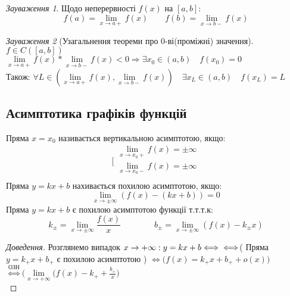 \documentclass[14pt,a4paper]{scrartcl}
\theoremstyle{definition}
\theoremstyle{remark}
\newtheorem*{remark}{Зауваження}
\theoremstyle{definition}
\theoremstyle{definition}
\begin{document}
  \begin{remark}
    Щодо неперервності  $f(x)$ на $[a,b]$:
    $$f(a) =  \lim\limits_{x\to a+}{f(x)} \qquad   f(b) = \lim\limits_{x\to b-}{f(x)}$$
  \end{remark}
\begin{remark}[Узагальнення теореми про 0-ві(проміжні) значення]
$f \in C([a,b]) \quad$\\
 $\lim\limits_{x\to a+}{f(x)} *  \lim\limits_{x\to b-}{f(x)} < 0 \Rightarrow \exists x_0 \in (a, b) \quad f(x_0) = 0$\\
 Також: $\forall L \in (\lim\limits_{x\to a+}{f(x)}, \lim\limits_{x\to b-}{f(x)} ) \quad \exists x_L \in (a,b) \quad f(x_L) = L$
\end{remark}


\subsection{Асимптотика графіків функцій}
Пряма $x = x_0$ називається вертикальною асимптотою, якщо:\\
$$\Bigg[ \begin{gathered}
  \lim\limits_{x\to x_0+}{f(x)} = \pm \infty\\
  \lim\limits_{x\to x_0-}{f(x)} = \pm \infty\\
\end{gathered}$$
\ed
\bd
  Пряма $y = kx + b$ нахивається похилою асимптотою, якщо:\\
  $$ \lim\limits_{x\to \pm\infty}{(f(x) - (kx+b))} = 0$$
\ed
\bbt
  Пряма $y = kx + b$ є похилою асимптотою функції т.т.т.к:\\
  $$
      k_{\pm} =  \lim\limits_{x\to \pm \infty}{ \frac{f(x)}{x} } \qquad\qquad
      b_{\pm} =  \lim\limits_{x\to \pm \infty}{(f(x) - k_{\pm}x)}
  $$
\ebt
\begin{proof}[Доведення]
Розглянемо випадок $x\to + \infty : y = kx + b \Longleftrightarrow \\ \Longleftrightarrow$\big( Пряма $y = k_+x+ b_+$ є похилою асимптотою \big) $\Longleftrightarrow \big( f(x) = k_+x + b_+ + o(x)\big) $ $\overset{\text{ОЗН}}{\Longleftrightarrow}  \big(  \lim\limits_{x\to  +\infty}{(f(x) - k_+ + \frac{b_+}{x} } \big)$\\
 \end{proof}
\end{document}
